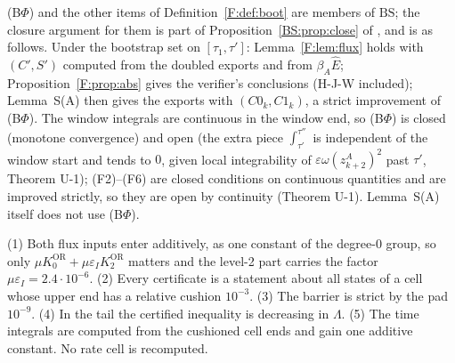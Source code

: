 \documentclass[11pt]{article}
\newcommand{\fn}[1]{\texttt{\detokenize{#1}}}
\newcommand{\OR}{\mathrm{OR}}\newcommand{\eI}{\varepsilon_I}
\begin{document}
\begin{remark}\label{F:rem:boot}
(B$\Phi$) and the other items of Definition~\ref{F:def:boot} are members of $\mathrm{BS}$; the closure argument for them is part of Proposition~\ref{BS:prop:close} of \fn{bootstrap_v39.tex}, and is as follows. Under the bootstrap set on $[\tau_1,\tau']$: Lemma~\ref{F:lem:flux} holds with $(C',S')$ computed from the doubled exports and from $\beta_A\hat E$; Proposition~\ref{F:prop:abs} gives the verifier's conclusions (H-J-W included); Lemma~S(A) then gives the exports with $(C0_k,C1_k)$, a strict improvement of (B$\Phi$). The window integrals are continuous in the window end, so (B$\Phi$) is closed (monotone convergence) and open (the extra piece $\int_{\tau'}^{\tau''}$ is independent of the window start and tends to $0$, given local integrability of $\varepsilon\omega(z^A_{k+2})^2$ past $\tau'$, Theorem U-1); (F2)--(F6) are closed conditions on continuous quantities and are improved strictly, so they are open by continuity (Theorem U-1). Lemma~S(A) itself does not use (B$\Phi$).
\end{remark}

\begin{remark}
(1) Both flux inputs enter additively, as one constant of the degree-0 group, so only $\mu K_0^{\OR}+\mu\eI K_2^{\OR}$ matters and the level-2 part carries the factor $\mu\eI=2.4\cdot10^{-6}$. (2) Every certificate is a statement about all states of a cell whose upper end has a relative cushion $10^{-3}$. (3) The barrier is strict by the pad $10^{-9}$. (4) In the tail the certified inequality is decreasing in $\Lambda$. (5) The time integrals are computed from the cushioned cell ends and gain one additive constant. No rate cell is recomputed.
\end{remark}
\end{document}
